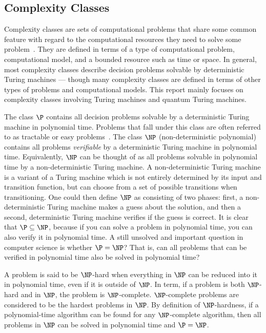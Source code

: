 \subsection{Complexity Classes}
Complexity classes are sets of computational problems that share some common feature with regard to the computational resources they need to solve some problem~\cite{arora2009computational}.
They are defined in terms of a type of computational problem, computational model, and a bounded resource such as time or space.
In general, most complexity classes describe decision problems solvable by deterministic Turing machines --- though many complexity classes are defined in terms of other types of problems and computational models.
This report mainly focuses on complexity classes involving Turing machines and quantum Turing machines.

The class $\P$ contains all decision problems solvable by a deterministic Turing machine in polynomial time.
Problems that fall under this class are often referred to as tractable or easy problems~\cite{cormen2009introduction}.
The class $\NP$ (non-deterministic polynomial) contains all problems \emph{verifiable} by a deterministic Turing machine in polynomial time.
Equivalently, $\NP$ can be thought of as all problems solvable in polynomial time by a non-deterministic Turing machine.
A non-deterministic Turing machine is a variant of a Turing machine which is not entirely determined by its input and transition function, but can choose from a set of possible transitions when transitioning.
One could then define $\NP$ as consisting of two phases: first, a non-deterministic Turing machine makes a guess about the solution, and then a second, deterministic Turing machine verifies if the guess is correct.
It is clear that $\P \subseteq \NP$, because if you can solve a problem in polynomial time, you can also verify it in polynomial time.
A still unsolved and important question in computer science is whether $\P = \NP$?
That is, can all problems that can be verified in polynomial time also be solved in polynomial time?

A problem is said to be $\NP$-hard when everything in $\NP$ can be reduced into it in polynomial time, even if it is outside of $\NP$.
In term, if a problem is both $\NP$-hard and in $\NP$, the problem is $\NP$-complete.
$\NP$-complete problems are considered to be the hardest problems in $\NP$.
By definition of $\NP$-hardness, if a polynomial-time algorithm can be found for any $\NP$-complete algorithm, then all problems in $\NP$ can be solved in polynomial time and $\P = \NP$.

